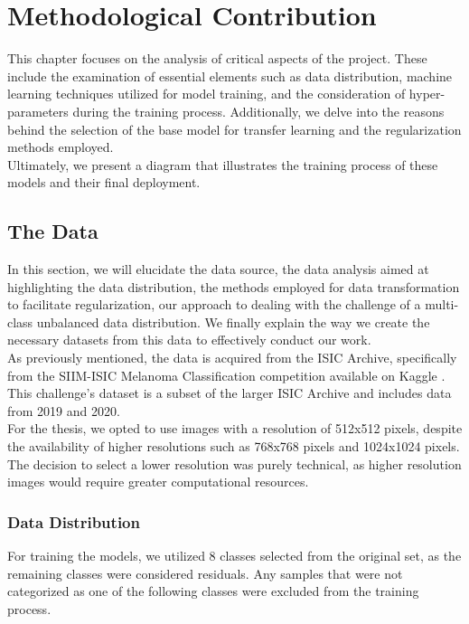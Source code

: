 \chapter{Methodological Contribution} \label{cap:contrib}


This chapter focuses on the analysis of critical aspects of the project. These
include the examination of essential elements such as data distribution,
machine learning techniques utilized for model training, and the consideration
of hyper-parameters during the training process. Additionally, we delve into
the reasons behind the selection of the base model for transfer learning and
the regularization methods employed. \\

Ultimately, we present a diagram that illustrates the training process of these
models and their final deployment.

\section{The Data}

In this section, we will elucidate the data source, the data analysis aimed at
highlighting the data distribution, the methods employed for data
transformation to facilitate regularization, our approach to dealing with the
challenge of a multi-class unbalanced data distribution. We finally explain the
way we create the necessary datasets from this data to effectively conduct our
work. \\

As previously mentioned, the data is acquired from the ISIC Archive,
specifically from the SIIM-ISIC Melanoma Classification competition available
on Kaggle \cite{ISICKaggle}. This challenge's dataset is a subset of the larger
ISIC Archive and includes data from 2019 and 2020. \\

For the thesis, we opted to use images with a resolution of 512x512 pixels,
despite the availability of higher resolutions such as 768x768 pixels and 1024x1024 pixels.
The decision to select a lower resolution was purely technical, as higher
resolution images would require greater computational resources. \\

\subsection{Data Distribution}

For training the models, we utilized 8 classes selected from the original set,
as the remaining classes were considered residuals. Any samples that were not
categorized as one of the following classes were excluded from the training
process.

